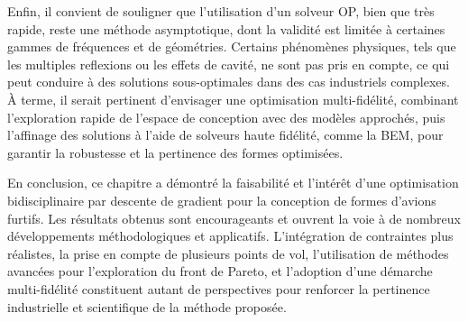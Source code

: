Enfin, il convient de souligner que l'utilisation d'un solveur OP, bien que très rapide, reste une méthode asymptotique, dont la validité est limitée à certaines gammes de fréquences et de géométries. Certains phénomènes physiques, tels que les multiples reflexions ou les effets de cavité, ne sont pas pris en compte, ce qui peut conduire à des solutions sous-optimales dans des cas industriels complexes. À terme, il serait pertinent d'envisager une optimisation multi-fidélité, combinant l'exploration rapide de l'espace de conception avec des modèles approchés, puis l'affinage des solutions à l'aide de solveurs haute fidélité, comme la BEM, pour garantir la robustesse et la pertinence des formes optimisées.

En conclusion, ce chapitre a démontré la faisabilité et l'intérêt d'une optimisation bidisciplinaire par descente de gradient pour la conception de formes d'avions furtifs. Les résultats obtenus sont encourageants et ouvrent la voie à de nombreux développements méthodologiques et applicatifs. L'intégration de contraintes plus réalistes, la prise en compte de plusieurs points de vol, l'utilisation de méthodes avancées pour l'exploration du front de Pareto, et l'adoption d'une démarche multi-fidélité constituent autant de perspectives pour renforcer la pertinence industrielle et scientifique de la méthode proposée.

\printbibliography[heading=subbibintoc]
